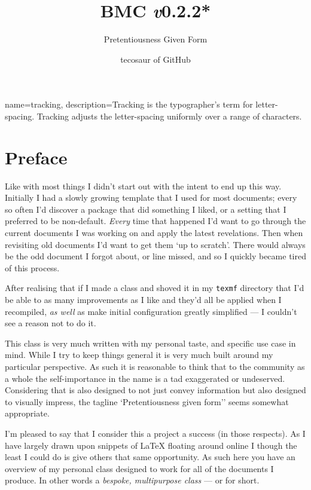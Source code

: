 \documentclass[solid,math,chem,code,plot,gloss]{bmc}
\title{\texorpdfstring{BMC \hfill \fontsize{1.35cm}{1.35cm}\fontseries{t}\selectfont \emph{v}0.2.2*}{BMC v0.2.2*}}
\subtitle{Pretentiousness Given Form}
\author{tecosaur \footnotesize \newline of GitHub}
\begin{document}
{
    name=tracking,
    description={Tracking is the typographer's term for letter-spacing. Tracking adjusts the letter-spacing uniformly over a range of characters.}
}

\maketitle

\section*{Preface}

\vspace{1cm}

Like with most things I didn't start out with the intent to end up this way.
Initially I had a slowly growing template that I used for most documents;
every so often I'd discover a package that did something I liked,
or a setting that I preferred to be non-default.
\emph{Every} time that happened I'd want to go through the current documents
I was working on and apply the latest revelations.
Then when revisiting old documents I'd want to get them `up to scratch'.
There would always be the odd document I forgot about, or line missed,
and so I quickly became tired of this process.

After realising that if I made a class and shoved it in my \verb|texmf|
directory that I'd be able to as many improvements as I like and they'd all
be applied when I recompiled, \emph{as well} as make initial configuration
greatly simplified --- I couldn't see a reason not to do it.

This class is very much written with my personal taste, and specific use case in mind.
While I try to keep things general it is very much built around my particular perspective.
As such it is reasonable to think that to the community as a whole the
self-importance in the name is a tad exaggerated or undeserved.
Considering that is also designed to not just convey information but also
designed to visually impress, the tagline `Pretentiousness given form''
seems somewhat appropriate.

I'm pleased to say that I consider this a project a success (in those respects).
As I have largely drawn upon snippets of LaTeX floating around online
I though the least I could do is give others that same opportunity.
As such here you have an overview of my personal class
designed to work for all of the documents I produce.
In other words a \emph{bespoke, multipurpose class} --- or  for short.
\end{document}
